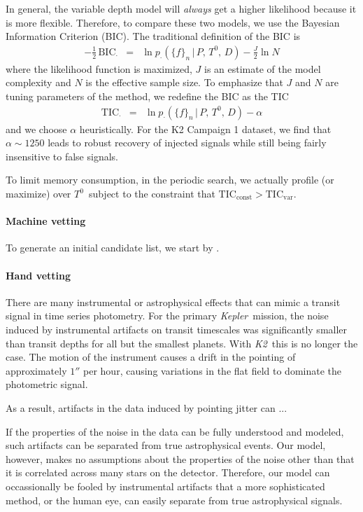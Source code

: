 \documentclass[12pt,preprint]{aastex}
\newcommand{\project}[1]{\textsl{#1}} %
\newcommand{\kepler}{\project{Kepler}}
\newcommand{\KT}{\project{K2}}
\newcommand{\BIC}{{\ensuremath{\mathrm{BIC}}}}
\newcommand{\TIC}{{\ensuremath{\mathrm{TIC}}}}
\newcommand{\flux}{{\ensuremath{f}}}
\newcommand{\period}{{\ensuremath{P}}}
\newcommand{\phase}{{\ensuremath{T^0}}}
\newcommand{\duration}{{\ensuremath{D}}}
\begin{document}
In general, the variable depth model will \emph{always} get a higher
likelihood because it is more flexible.
Therefore, to compare these two models, we use the Bayesian Information
Criterion (BIC).
The traditional definition of the BIC is
\begin{eqnarray}
-\frac{1}{2}\,\BIC_\cdot &=&
    \ln p_\cdot(\{\flux\}_n\,|\,\period,\,\phase,\,\duration)
    - \frac{J}{2} \ln N
\end{eqnarray}
where the likelihood function is maximized, $J$ is an estimate of the model
complexity and $N$ is the effective sample size.
To emphasize that $J$ and $N$ are tuning parameters of the method, we
redefine the BIC as the TIC
\begin{eqnarray}
\TIC_\cdot &=&
    \ln p_\cdot(\{\flux\}_n\,|\,\period,\,\phase,\,\duration) - \alpha
\end{eqnarray}
and we choose $\alpha$ heuristically.
For the K2 Campaign 1 dataset, we find that $\alpha \sim 1250$ leads to robust
recovery of injected signals while still being fairly insensitive to false
signals.

To limit memory consumption, in the periodic search, we actually profile (or
maximize) over \phase\ subject to the constraint that $\TIC_\mathrm{const} >
\TIC_\mathrm{var}$.


\paragraph{Machine vetting}

To generate an initial candidate list, we start by .

\paragraph{Hand vetting}

There are many instrumental or astrophysical effects that can mimic a transit
signal in time series photometry.
For the primary \kepler\ mission, the noise induced by instrumental artifacts
on transit timescales was significantly smaller than transit depths for
all but the smallest planets.
With \KT\ this is no longer the case.
The motion of the instrument causes a drift in the pointing of approximately
$1''$ per hour, causing variations in the flat field to dominate the
photometric signal.

As a result, artifacts in the data induced by pointing jitter can ...

If the properties of the noise in the data can be fully understood and
modeled, such artifacts can be separated from true astrophysical events.
Our model, however, makes no assumptions about the properties of the noise
other than that it is correlated across many stars on the detector.
Therefore, our model can occassionally be fooled by instrumental artifacts
that a more sophisticated method, or the human eye, can easily separate
from true astrophysical signals.
\end{document}
